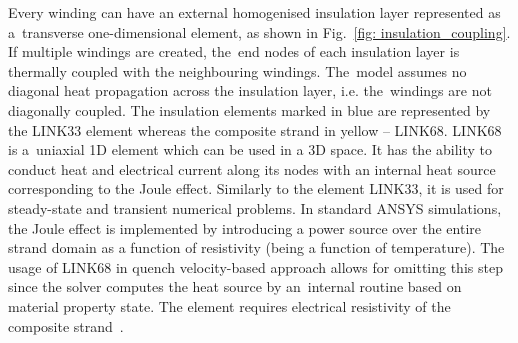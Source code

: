 Every winding can have an external homogenised insulation layer represented as a~transverse one-dimensional element, as shown in Fig.~\ref{fig: insulation_coupling}. If multiple windings are created, the~end nodes of each insulation layer is thermally coupled with the neighbouring windings. The~model assumes no diagonal heat propagation across the insulation layer, i.e. the~windings are not diagonally coupled. The insulation elements marked in blue are represented by the LINK33 element whereas the composite strand in yellow -- LINK68. LINK68 is a~uniaxial 1D element which can be used in a 3D space. It has the ability to conduct heat and electrical current along its nodes with an internal heat source corresponding to the Joule effect. Similarly to the element LINK33, it is used for steady-state and transient numerical problems. In standard ANSYS simulations, the Joule effect is implemented by introducing a power source over the entire strand domain as a function of resistivity (being a function of temperature). The usage of LINK68 in quench velocity-based approach allows for omitting this step since the solver computes the heat source by an~internal routine based on material property state. The element requires electrical resistivity of the composite strand~\cite{ansys_element_manual}.

